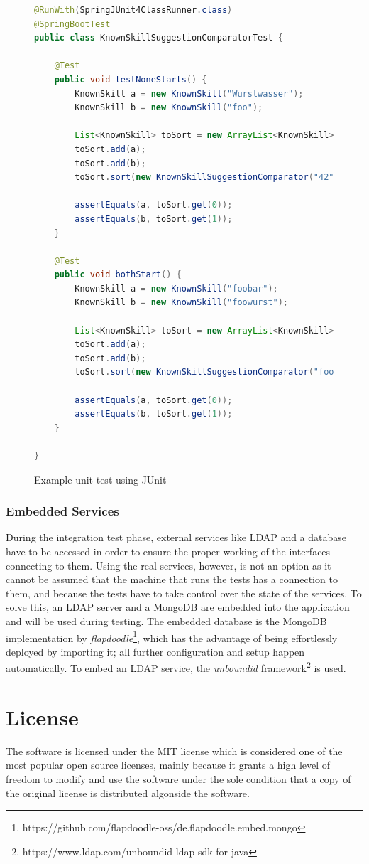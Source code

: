\begin{figure}[h]
\begin{lstlisting}[language=Java]
@RunWith(SpringJUnit4ClassRunner.class)
@SpringBootTest
public class KnownSkillSuggestionComparatorTest {

	@Test
	public void testNoneStarts() {
		KnownSkill a = new KnownSkill("Wurstwasser");
		KnownSkill b = new KnownSkill("foo");

		List<KnownSkill> toSort = new ArrayList<KnownSkill>();
		toSort.add(a);
		toSort.add(b);
		toSort.sort(new KnownSkillSuggestionComparator("42"));

		assertEquals(a, toSort.get(0));
		assertEquals(b, toSort.get(1));
	}

	@Test
	public void bothStart() {
		KnownSkill a = new KnownSkill("foobar");
		KnownSkill b = new KnownSkill("foowurst");

		List<KnownSkill> toSort = new ArrayList<KnownSkill>();
		toSort.add(a);
		toSort.add(b);
		toSort.sort(new KnownSkillSuggestionComparator("foo"));

		assertEquals(a, toSort.get(0));
		assertEquals(b, toSort.get(1));
	}

}
\end{lstlisting}
\caption[Example Unit Test]{Example unit test using JUnit}
\end{figure}


\subsubsection{Embedded Services}
During the integration test phase, external services like LDAP and a database have to be accessed in order to ensure the proper working of the interfaces connecting to them. Using the real services, however, is not an option as it cannot be assumed that the machine that runs the tests has a connection to them, and because the tests have to take control over the state of the services. To solve this, an LDAP server and a MongoDB are embedded into the application and will be used during testing.
The embedded database is the MongoDB implementation by \textit{flapdoodle}\footnote{https://github.com/flapdoodle-oss/de.flapdoodle.embed.mongo}, which has the advantage of being effortlessly deployed by importing it; all further configuration and setup happen automatically.
To embed an LDAP service, the \textit{unboundid} framework\footnote{https://www.ldap.com/unboundid-ldap-sdk-for-java} is used.

\section{License}
The software is licensed under the MIT license \cite{license} which is considered one of the most popular open source licenses, mainly because it grants a high level of freedom to modify and use the software under the sole condition that a copy of the original license is distributed algonside the software.

